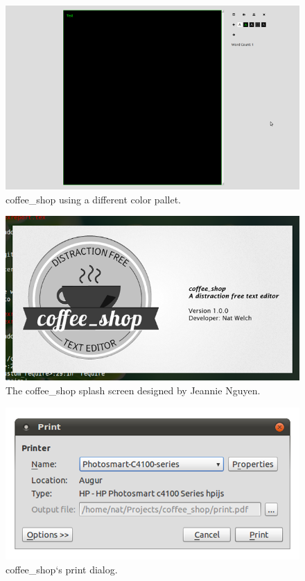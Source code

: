 \documentclass[10pt]{article}
\begin{document}
\begin{figure}
   \centering
      \includegraphics[width=130mm]{images/coffee_shop3.png}
   \caption{coffee\_shop using a different color pallet.}
\end{figure}

\begin{figure}
   \centering
      \includegraphics[width=130mm]{images/coffee_shop4.png}
   \caption{The coffee\_shop splash screen designed by Jeannie Nguyen\protect\cite{jeannie}.}
\end{figure}

\begin{figure}
   \centering
      \includegraphics[width=130mm]{images/coffee_shop5.png}
   \caption{coffee\_shop`s print dialog.}
\end{figure}
\end{document}
